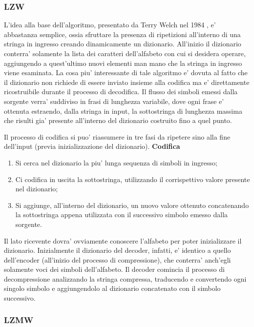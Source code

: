 \documentclass[a4paper,11pt]{article}
\theoremstyle{definition}
\begin{document}
\subsubsection{LZW}
L'idea alla base dell'algoritmo, presentato da Terry Welch nel 1984 \cite{lzw}, e' abbastanza semplice, ossia sfruttare la presenza di ripetizioni all'interno di una stringa in ingresso creando dinamicamente un dizionario. All'inizio il dizionario conterra' solamente la lista dei caratteri dell'alfabeto con cui si desidera operare, aggiungendo a quest'ultimo nuovi elementi man mano che la stringa in ingresso viene esaminata. La cosa piu' interessante di tale algoritmo e' dovuta al fatto che il dizionario non richiede di essere inviato insieme alla codifica ma e' direttamente ricostruibile durante il processo di decodifica. 
Il flusso dei simboli emessi dalla sorgente verra' suddiviso in frasi di lunghezza variabile, dove ogni frase e' ottenuta estraendo, dalla stringa in input, la sottostringa di lunghezza massima che risulti gia' presente all'interno del dizionario costruito fino a quel punto.

Il processo di codifica si puo' riassumere in tre fasi da ripetere sino alla fine dell'input (previa inizializzazione del dizionario).
\newline \newline
\noindent \textbf{Codifica}
\begin{enumerate}
	\item Si cerca nel dizionario la piu' lunga sequenza di simboli in ingresso;
	\item Ci codifica in uscita la sottostringa, utilizzando il corrispettivo valore presente nel dizionario;
	\item Si aggiunge, all'interno del dizionario, un nuovo valore ottenuto concatenando la sottostringa appena utilizzata con il successivo simbolo emesso dalla sorgente. 
\end{enumerate}

\noindent Il lato ricevente dovra' ovviamente conoscere l'alfabeto per poter inizializzare il dizionario. Inizialmente il dizionario del decoder, infatti, e' identico a quello dell'encoder (all'inizio del processo di compressione), che conterra' anch'egli solamente voci dei simboli dell'alfabeto. Il decoder comincia il processo di decompressione analizzando la stringa compressa, traducendo e convertendo ogni singolo simbolo e aggiungendolo al dizionario concatenato con il simbolo successivo. 

\subsubsection{LZMW}
\end{document}
